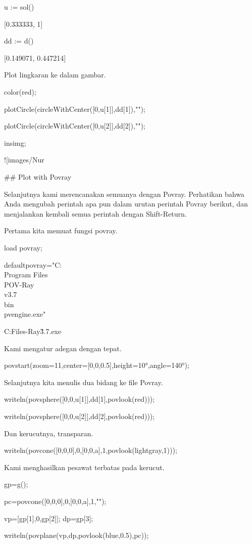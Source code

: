 \documentclass{article}
\begin{document}
\>u := sol()


    [0.333333,  1]

\>dd := d()


    [0.149071,  0.447214]

Plot lingkaran ke dalam gambar.


\>color(red);

\>plotCircle(circleWithCenter([0,u[1]],dd[1]),"");

\>plotCircle(circleWithCenter([0,u[2]],dd[2]),"");

\>insimg;


![images/Nur%

## Plot with Povray

Selanjutnya kami merencanakan semuanya dengan Povray. Perhatikan bahwa
Anda mengubah perintah apa pun dalam urutan perintah Povray berikut,
dan menjalankan kembali semua perintah dengan Shift-Return.


Pertama kita memuat fungsi povray.


\>load povray;

\>defaultpovray="C:\\Program Files\\POV-Ray\\v3.7\\bin\\pvengine.exe"


    C:\Program Files\POV-Ray\v3.7\bin\pvengine.exe

Kami mengatur adegan dengan tepat.


\>povstart(zoom=11,center=[0,0,0.5],height=10°,angle=140°);


Selanjutnya kita menulis dua bidang ke file Povray.


\>writeln(povsphere([0,0,u[1]],dd[1],povlook(red)));

\>writeln(povsphere([0,0,u[2]],dd[2],povlook(red)));


Dan kerucutnya, transparan.


\>writeln(povcone([0,0,0],0,[0,0,a],1,povlook(lightgray,1)));


Kami menghasilkan pesawat terbatas pada kerucut.


\>gp=g();

\>pc=povcone([0,0,0],0,[0,0,a],1,"");

\>vp=[gp[1],0,gp[2]]; dp=gp[3];

\>writeln(povplane(vp,dp,povlook(blue,0.5),pc));
\end{document}
